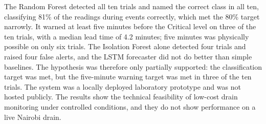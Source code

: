 \documentclass[12pt, a4paper]{article}
\begin{document}
The Random Forest detected all ten trials and named the correct class in all ten, classifying 81\% of the readings during events correctly, which met the 80\% target narrowly. It warned at least five minutes before the Critical level on three of the ten trials, with a median lead time of 4.2 minutes; five minutes was physically possible on only six trials. The Isolation Forest alone detected four trials and raised four false alerts, and the LSTM forecaster did not do better than simple baselines. The hypothesis was therefore only partially supported: the classification target was met, but the five-minute warning target was met in three of the ten trials. The system was a locally deployed laboratory prototype and was not hosted publicly. The results show the technical feasibility of low-cost drain monitoring under controlled conditions, and they do not show performance on a live Nairobi drain.

\clearpage

\begin{center}
    \tableofcontents
    \clearpage
\end{center}
%
\begin{center}
    \listoffigures
    \clearpage
\end{center}
%
\begin{center}
    \listoftables
    \clearpage
\end{center}
%

\end{document}
